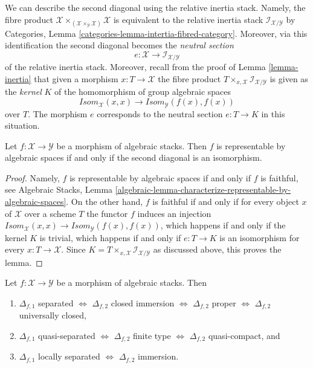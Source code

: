 \medskip\noindent
We can describe the second diagonal using the relative inertia stack.
Namely, the fibre product
$\mathcal{X}
\times_{(\mathcal{X} \times_\mathcal{Y} \mathcal{X})} \mathcal{X}$
is equivalent to the relative inertia stack
$\mathcal{I}_{\mathcal{X}/\mathcal{Y}}$ by
Categories, Lemma \ref{categories-lemma-intertia-fibred-category}.
Moreover, via this identification the second diagonal becomes the
{\it neutral section}
$$
e : \mathcal{X} \to \mathcal{I}_{\mathcal{X}/\mathcal{Y}}
$$
of the relative inertia stack. Moreover, recall from the proof of
Lemma \ref{lemma-inertia}
that given a morphism $x : T \to \mathcal{X}$ the fibre product
$T \times_{x, \mathcal{X}} \mathcal{I}_{\mathcal{X}/\mathcal{Y}}$
is given as the {\it kernel} $K$ of the homomorphism of group algebraic spaces
$$
\mathit{Isom}_\mathcal{X}(x, x)
\longrightarrow
\mathit{Isom}_\mathcal{Y}(f(x), f(x))
$$
over $T$. The morphism $e$ corresponds to the neutral section
$e : T \to K$ in this situation.

\begin{lemma}
\label{lemma-second-diagonal}
Let $f : \mathcal{X} \to \mathcal{Y}$ be a morphism of algebraic stacks.
Then $f$ is representable by algebraic spaces if and only if
the second diagonal is an isomorphism.
\end{lemma}

\begin{proof}
Namely, $f$ is representable by algebraic spaces if and only if $f$ is
faithful, see
Algebraic Stacks,
Lemma \ref{algebraic-lemma-characterize-representable-by-algebraic-spaces}.
On the other hand, $f$ is faithful if and only if for every object $x$
of $\mathcal{X}$ over a scheme $T$ the functor $f$ induces an injection
$\mathit{Isom}_\mathcal{X}(x, x) \to
\mathit{Isom}_\mathcal{Y}(f(x), f(x))$,
which happens if and only if the kernel $K$ is trivial, which happens if and
only if $e : T \to K$ is an isomorphism for every $x : T \to \mathcal{X}$.
Since $K = T \times_{x, \mathcal{X}} \mathcal{I}_{\mathcal{X}/\mathcal{Y}}$
as discussed above, this proves the lemma.
\end{proof}

\begin{lemma}
\label{lemma-first-diagonal-separated-second-diagonal-closed}
Let $f : \mathcal{X} \to \mathcal{Y}$ be a morphism of algebraic stacks.
Then
\begin{enumerate}
\item $\Delta_{f, 1}$ separated $\Leftrightarrow$
$\Delta_{f, 2}$ closed immersion $\Leftrightarrow$
$\Delta_{f, 2}$ proper $\Leftrightarrow$
$\Delta_{f, 2}$ universally closed,
\item $\Delta_{f, 1}$ quasi-separated $\Leftrightarrow$
$\Delta_{f, 2}$ finite type $\Leftrightarrow$ $\Delta_{f, 2}$ quasi-compact,
and
\item $\Delta_{f, 1}$ locally separated $\Leftrightarrow$
$\Delta_{f, 2}$ immersion.
\end{enumerate}
\end{lemma}

